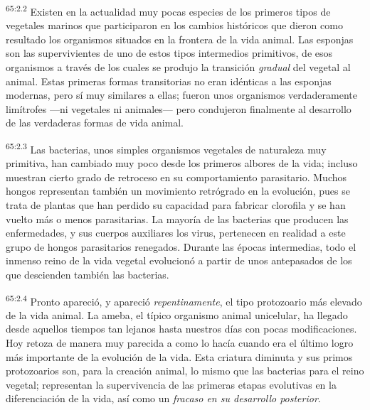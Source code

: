 \par
\textsuperscript{65:2.2} Existen en la actualidad muy pocas especies de los primeros tipos de vegetales marinos que participaron en los cambios históricos que dieron como resultado los organismos situados en la frontera de la vida animal. Las esponjas son las supervivientes de uno de estos tipos intermedios primitivos, de esos organismos a través de los cuales se produjo la transición \textit{gradual} del vegetal al animal. Estas primeras formas transitorias no eran idénticas a las esponjas modernas, pero sí muy similares a ellas; fueron unos organismos verdaderamente limítrofes ---ni vegetales ni animales--- pero condujeron finalmente al desarrollo de las verdaderas formas de vida animal.

\par
\textsuperscript{65:2.3} Las bacterias, unos simples organismos vegetales de naturaleza muy primitiva, han cambiado muy poco desde los primeros albores de la vida; incluso muestran cierto grado de retroceso en su comportamiento parasitario. Muchos hongos representan también un movimiento retrógrado en la evolución, pues se trata de plantas que han perdido su capacidad para fabricar clorofila y se han vuelto más o menos parasitarias. La mayoría de las bacterias que producen las enfermedades, y sus cuerpos auxiliares los virus, pertenecen en realidad a este grupo de hongos parasitarios renegados. Durante las épocas intermedias, todo el inmenso reino de la vida vegetal evolucionó a partir de unos antepasados de los que descienden también las bacterias.

\par
\textsuperscript{65:2.4} Pronto apareció, y apareció \textit{repentinamente}, el tipo protozoario más elevado de la vida animal. La ameba, el típico organismo animal unicelular, ha llegado desde aquellos tiempos tan lejanos hasta nuestros días con pocas modificaciones. Hoy retoza de manera muy parecida a como lo hacía cuando era el último logro más importante de la evolución de la vida. Esta criatura diminuta y sus primos protozoarios son, para la creación animal, lo mismo que las bacterias para el reino vegetal; representan la supervivencia de las primeras etapas evolutivas en la diferenciación de la vida, así como un \textit{fracaso en su desarrollo posterior}.

